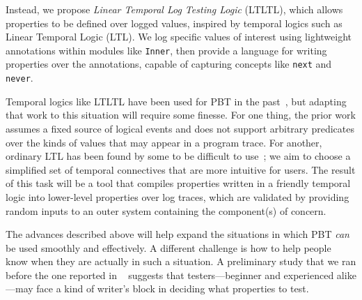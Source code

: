 Instead, we propose {\em Linear Temporal Log Testing Logic} (LTLTL), which allows
properties to be defined over logged values, inspired by temporal
logics such as Linear Temporal Logic (LTL).  We
log specific values of interest using lightweight annotations
within modules like \lstinline{Inner}, then provide a language for
writing properties over the annotations, capable of capturing concepts like
\lstinline{next} and \lstinline{never}.

Temporal logics like LTLTL have been used for PBT in the
past~\cite{oconnor_quickstrom_2022}, but adapting that work to this
situation will require some finesse. For one thing, the prior work
assumes a fixed source of logical events and does not
support arbitrary predicates over the kinds of values that may appear
in a program trace. For another, ordinary LTL has been found by some to be
difficult to use~\cite{greenman_little_2022}; we aim to choose a
simplified set of temporal connectives that are more intuitive for users.
%
The result of this task will be a tool that compiles properties written
in a friendly temporal logic into lower-level properties over log
traces, which are validated by providing random inputs to an outer
system {containing} the component(s) of concern.



%
The advances described above will help expand the situations in which
PBT {\em can} be used smoothly and effectively.  A different challenge is
how to help people know when they are actually in such a situation.
A preliminary study that we ran before the one reported in ~\cite{goldstein_problems_2022} suggests that testers---beginner and experienced alike---may face a kind of writer's block
in deciding what properties to test.

